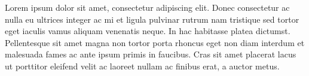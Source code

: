 Lorem ipsum dolor sit amet, consectetur adipiscing elit. Donec consectetur ac nulla eu ultrices integer ac mi et ligula pulvinar rutrum nam tristique sed tortor eget iaculis vamus aliquam venenatis neque. In hac habitasse platea dictumst. Pellentesque sit amet magna non tortor porta rhoncus eget non diam interdum et malesuada fames ac ante ipsum primis in faucibus. Cras sit amet placerat lacus ut porttitor eleifend velit ac laoreet nullam ac finibus erat, a auctor metus. 
